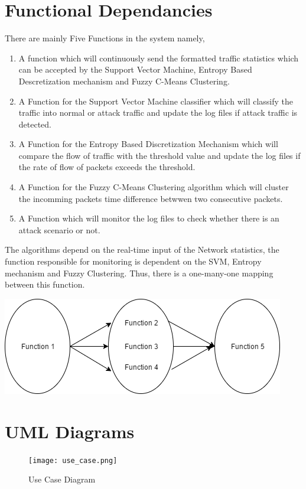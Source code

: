 \documentclass[12pt,a4paper,final]{report}
\DeclareRobustCommand{\gobblefive}[5]{}
\newcommand*{\SkipTocEntry}{\addtocontents{toc}{\gobblefive}}
\begin{document}
{{{{{\SkipTocEntry\section{Functional Dependancies}
There are mainly Five Functions in the system namely,
\begin{enumerate}
\item
A function which will continuously send the formatted traffic statistics which can be accepted by the Support Vector Machine, Entropy Based Descretization mechanism and Fuzzy C-Means Clustering.
\item
A Function for the Support Vector Machine classifier which will classify the traffic into normal or attack traffic and update the log files if attack traffic is detected.
\item
A Function for the Entropy Based Discretization Mechanism which will compare the flow of traffic with the threshold value and update the log files if the rate of flow of packets exceeds the threshold.
\item
A Function for the Fuzzy C-Means Clustering algorithm which will cluster the incomming packets time difference betwwen two consecutive packets.
\item
A Function which will monitor the log files to check whether there is an attack scenario or not.
\end{enumerate}
The algorithms depend on the real-time input of the Network statistics, the function responsible for monitoring is dependent on the SVM, Entropy mechanism and Fuzzy Clustering. Thus, there is a one-many-one mapping between this function.
\begin{center}
\includegraphics[scale=0.5]{functionalDependency.png}
\end{center}
\newpage

\SkipTocEntry\section{UML Diagrams}
\begin{figure}[h]
\begin{center}
\texttt{[image: use\_case.png]}
\caption{Use Case Diagram}
\vspace{2cm}


\end{center}
\end{figure}}}}}}
\end{document}
